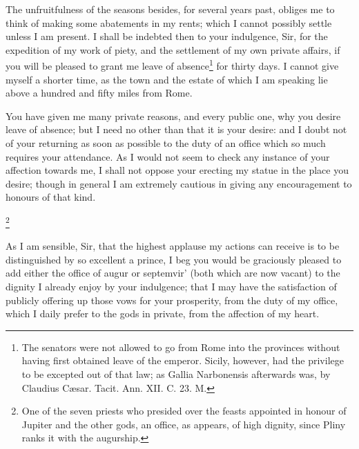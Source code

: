 The unfruitfulness of the seasons besides, for several years past, obliges
me to think of making some abatements in my rents; which I cannot possibly
settle unless I am present. I shall be indebted then to your indulgence,
Sir, for the expedition of my work of piety, and the settlement of my own
private affairs, if you will be pleased to grant me leave of absence\footnote{The senators were not
allowed to go from Rome into the provinces without having first obtained
leave of the emperor. Sicily, however, had the privilege to be excepted
out of that law; as Gallia Narbonensis afterwards was, by Claudius Cæsar.
Tacit. Ann. XII. C. 23. M.}
for thirty days. I cannot give myself a shorter time, as the town and the
estate of which I am speaking lie above a hundred and fifty miles from
Rome.


You have given me many private reasons, and every public one, why you
desire leave of absence; but I need no other than that it is your desire:
and I doubt not of your returning as soon as possible to the duty of an
office which so much requires your attendance. As I would not seem to
check any instance of your affection towards me, I shall not oppose your
erecting my statue in the place you desire; though in general I am
extremely cautious in giving any encouragement to honours of that kind.


\footnote{One of the seven
priests who presided over the feasts appointed in honour of Jupiter and
the other gods, an office, as appears, of high dignity, since Pliny ranks
it with the augurship.}

As I am sensible, Sir, that the highest applause my actions can receive is
to be distinguished by so excellent a prince, I beg you would be
graciously pleased to add either the office of augur or septemvir' (both
which are now vacant) to the dignity I already enjoy by your indulgence;
that I may have the satisfaction of publicly offering up those vows for
your prosperity, from the duty of my office, which I daily prefer to the
gods in private, from the affection of my heart.


